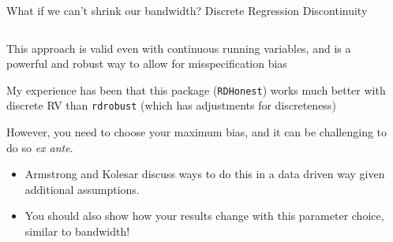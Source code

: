 \documentclass[notes,11pt, aspectratio=169]{beamer}
\newenvironment{wideitemize}{\itemize\addtolength{\itemsep}{10pt}}{\enditemize}
\begin{document}
\begin{frame}{What if we can't shrink our bandwidth? Discrete Regression Discontinuity}
    \begin{columns}[onlytextwidth, T] %
      \begin{column}{.8\textwidth}
        \begin{wideitemize}
        \item This approach is valid even with continuous running
          variables, and is a powerful and robust way to allow for
          misspecification bias
        \item My experience has been that this package
          (\texttt{RDHonest}) works much better with discrete RV than
          \texttt{rdrobust} (which has adjustments for discreteness)
        \item However, you need to choose your maximum bias, and it
          can be challenging to do so \emph{ex ante}.
          \begin{itemize}
          \item Armstrong and Kolesar discuss ways to do this in a
            data driven way given additional assumptions.
          \item You should also show how your results change with this
            parameter choice, similar to bandwidth!
          \end{itemize}
        \end{wideitemize}
      \end{column}%
      \hfill%
      \begin{column}{.4\textwidth}
      \end{column}%
    \end{columns}
\end{frame}
\end{document}

